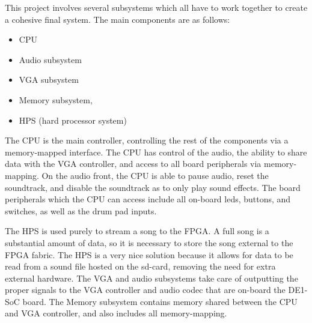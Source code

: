 \documentclass{subfile}
\begin{document}
  This project involves several subsystems which all have to work together to create a 
  cohesive final system. 
  The main components are as follows: 
  \begin{itemize} 
  \item CPU 
  \item Audio subsystem 
  \item VGA subsystem 
  \item Memory subsystem, 
  \item HPS (hard processor system)
  \end{itemize}

  The CPU is the main controller, controlling the rest of the components via a memory-mapped interface. 
  The CPU has control of the audio, the ability to share data with the VGA controller, and access 
  to all board peripherals via memory-mapping.
  On the audio front, the CPU is able to pause audio, reset the soundtrack, and disable the 
  soundtrack as to only play sound effects.
  The board peripherals which the CPU can access include all on-board leds, buttons, and switches, 
  as well as the drum pad inputs.

  The HPS is used purely to stream a song to the FPGA. 
  A full song is a substantial amount of data, so it is necessary to store the song external to 
  the FPGA fabric. 
  The HPS is a very nice solution because it allows for data to be read from a sound file hosted 
  on the sd-card, removing the need for extra external hardware.
  The VGA and audio subsystems take care of outputting the proper signals to the VGA 
  controller and audio codec that are on-board the DE1-SoC board.
  The Memory subsystem contains memory shared between the CPU and VGA controller, and 
  also includes all memory-mapping.
\end{document}
